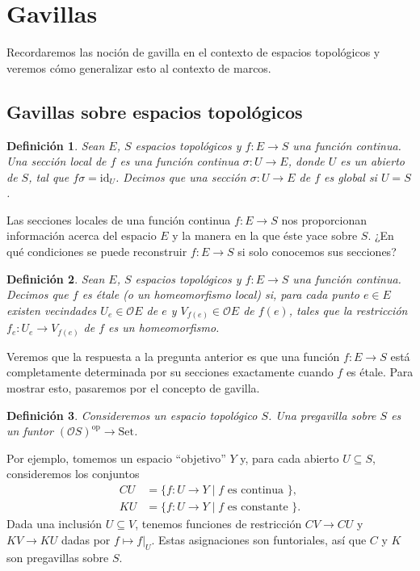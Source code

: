 \documentclass[12pt,letterpaper,titlepage]{article}
\newtheorem*{defn}{Definición}
\theoremstyle{definition}
\renewcommand\cal[1]{\mathcal{#1}}
\newcommand\<{\langle}
\renewcommand\>{\rangle}
\newcommand{\Con}{\mathrm{Set}}
\newcommand{\id}{\mathrm{id}}
\newcommand{\op}{\mathrm{op}}
\begin{document}
\section{Gavillas}

Recordaremos las noción de gavilla en el contexto
de espacios topológicos y veremos cómo generalizar esto
al contexto de marcos.

\subsection{Gavillas sobre espacios topológicos}

\begin{defn}
    Sean $E$, $S$ espacios topológicos
    y $f:E\to S$ una función continua.
    Una sección local de $f$ es una función continua $\sigma:U\to E$,
    donde $U$ es un abierto de $S$, tal que $f\sigma=\id_U$.
    Decimos que una sección $\sigma:U\to E$ de $f$ es global si $U=S$.
\end{defn}

Las secciones locales de una función continua $f:E\to S$
nos proporcionan información acerca del espacio $E$
y la manera en la que éste yace sobre $S$.
¿En qué condiciones se puede reconstruir $f:E\to S$ si solo
conocemos sus secciones?

\begin{defn}
    Sean $E$, $S$ espacios topológicos
    y $f:E\to S$ una función continua.
    Decimos que $f$ es étale (o un homeomorfismo local) si,
    para cada punto $e\in E$ existen vecindades
    $U_e\in\cal OE$ de $e$ y $V_{f(e)}\in\cal OE$ de $f(e)$,
    tales que la restricción
    $f_e:U_e\to V_{f(e)}$ de $f$ es un homeomorfismo.
\end{defn}

Veremos que la respuesta a la pregunta anterior
es que una función $f:E\to S$ está completamente determinada
por su secciones exactamente cuando $f$ es étale.
Para mostrar esto, pasaremos por el concepto de gavilla.

\begin{defn}
    Consideremos un espacio topológico $S$.
    Una pregavilla sobre $S$ es un funtor $(\cal OS)^\op\to\Con$.
\end{defn}

Por ejemplo, tomemos un espacio ``objetivo'' $Y$ y,
para cada abierto $U\subseteq S$,
consideremos los conjuntos
\begin{align*}
    CU &= \{f:U\to Y\mid f \text{ es continua }\}, \\
    KU &= \{f:U\to Y\mid f \text{ es constante }\}.
\end{align*}
Dada una inclusión $U\subseteq V$,
tenemos funciones de restricción $CV\to CU$ y $KV\to KU$
dadas por $f\mapsto f|_U$.
Estas asignaciones son funtoriales,
así que $C$ y $K$ son pregavillas sobre $S$.
\end{document}
